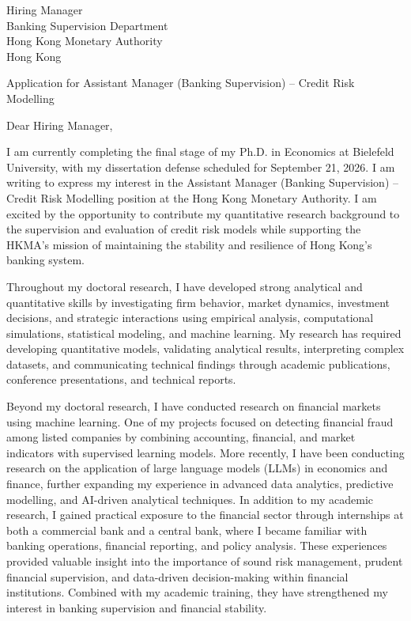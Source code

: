 \documentclass[11pt]{article}
\begin{document}
\noindent
Hiring Manager \\
Banking Supervision Department \\
Hong Kong Monetary Authority \\
Hong Kong \\

\vspace{0.1cm}

\noindent
Application for Assistant Manager (Banking Supervision) -- Credit Risk Modelling \\

\vspace{0.05cm}

\noindent Dear Hiring Manager,

I am currently completing the final stage of my Ph.D. in Economics at Bielefeld University, with my dissertation defense scheduled for September 21, 2026. I am writing to express my interest in the Assistant Manager (Banking Supervision) -- Credit Risk Modelling position at the Hong Kong Monetary Authority. I am excited by the opportunity to contribute my quantitative research background to the supervision and evaluation of credit risk models while supporting the HKMA's mission of maintaining the stability and resilience of Hong Kong's banking system.

Throughout my doctoral research, I have developed strong analytical and quantitative skills by investigating firm behavior, market dynamics, investment decisions, and strategic interactions using empirical analysis, computational simulations, statistical modeling, and machine learning. My research has required developing quantitative models, validating analytical results, interpreting complex datasets, and communicating technical findings through academic publications, conference presentations, and technical reports. 

Beyond my doctoral research, I have conducted research on financial markets using machine learning. One of my projects focused on detecting financial fraud among listed companies by combining accounting, financial, and market indicators with supervised learning models. More recently, I have been conducting research on the application of large language models (LLMs) in economics and finance, further expanding my experience in advanced data analytics, predictive modelling, and AI-driven analytical techniques.
In addition to my academic research, I gained practical exposure to the financial sector through internships at both a commercial bank and a central bank, where I became familiar with banking operations, financial reporting, and policy analysis. These experiences provided valuable insight into the importance of sound risk management, prudent financial supervision, and data-driven decision-making within financial institutions. Combined with my academic training, they have strengthened my interest in banking supervision and financial stability.
\end{document}
